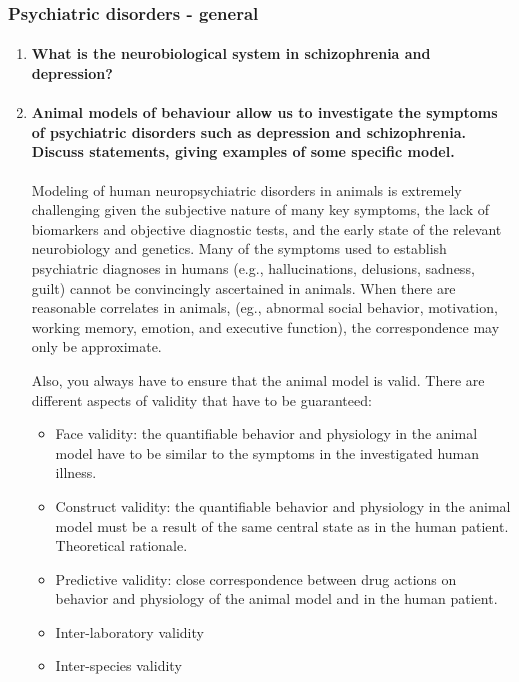 \documentclass[12pt,article,oneside,a4paper]{memoir}
\begin{document}
\subsubsection{Psychiatric disorders - general}
\begin{enumerate}
\item \paragraph{What is the neurobiological system in schizophrenia and depression?}

\item \paragraph{Animal models of behaviour allow us to investigate the
symptoms of psychiatric disorders such as depression and schizophrenia. Discuss
statements, giving examples of some specific model.}

Modeling of human neuropsychiatric disorders in animals is extremely
challenging given the subjective nature of many key symptoms, the lack of
biomarkers and objective diagnostic tests, and the early state of the relevant
neurobiology and genetics. Many of the symptoms used to establish psychiatric
diagnoses in humans (e.g., hallucinations, delusions, sadness, guilt) cannot be
convincingly ascertained in animals. When there are reasonable correlates in
animals, (eg., abnormal social behavior, motivation, working memory, emotion,
and executive function), the correspondence may only be approximate.

Also, you always have to ensure that the animal model is valid. There are
different aspects of validity that have to be guaranteed:
\begin{itemize}
\item Face validity: the quantifiable behavior and physiology in the animal
model have to be similar to the symptoms in the investigated human illness.
\item Construct validity: the quantifiable behavior and physiology in the
animal model must be a result of the same central state as in the human
patient. Theoretical rationale.
\item Predictive validity: close correspondence between drug actions on
behavior and physiology of the animal model and in the human patient.
\item Inter-laboratory validity
\item Inter-species validity
\end{itemize}


\end{enumerate}
\end{document}
